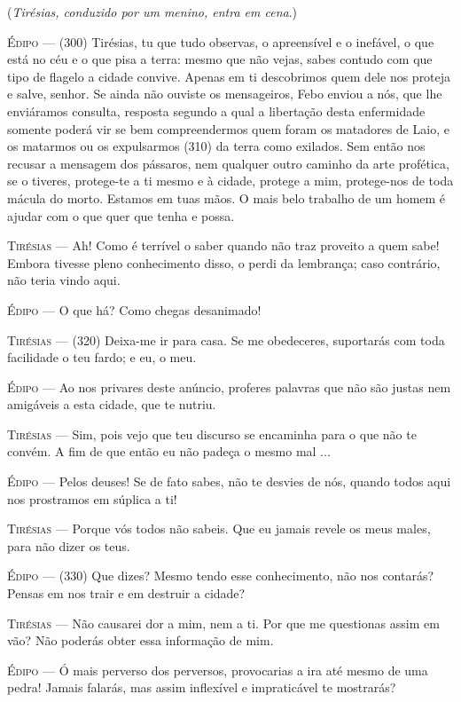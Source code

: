 (\emph{Tirésias, conduzido por um menino, entra em cena}.)

\textsc{Édipo} --- (300) Tirésias, tu que tudo observas, o apreensível e o inefável, o que
está no céu e o que pisa a terra: mesmo que não vejas, sabes contudo com
que tipo de flagelo a cidade convive. Apenas em ti descobrimos quem dele
nos proteja e salve, senhor. Se ainda não ouviste os mensageiros, Febo
enviou a nós, que lhe enviáramos consulta, resposta segundo a qual a
libertação desta enfermidade somente poderá vir se bem compreendermos
quem foram os matadores de Laio, e os matarmos ou os expulsarmos (310)
da terra como exilados. Sem então nos recusar a mensagem dos pássaros,
nem qualquer outro caminho da arte profética, se o tiveres, protege-te a
ti mesmo e à cidade, protege a mim, protege-nos de toda mácula do morto.
Estamos em tuas mãos. O mais belo trabalho de um homem é ajudar com o
que quer que tenha e possa.

\textsc{Tirésias} --- Ah! Como é terrível o saber quando não traz proveito a quem sabe! Embora
tivesse pleno conhecimento disso, o perdi da lembrança; caso contrário,
não teria vindo aqui.

\textsc{Édipo} --- O que há? Como chegas desanimado!

\textsc{Tirésias} --- (320) Deixa-me ir para casa. Se me obedeceres, suportarás com toda
facilidade o teu fardo; e eu, o meu.

\textsc{Édipo} --- Ao nos privares deste anúncio, proferes palavras que não são justas nem
amigáveis a esta cidade, que te nutriu.

\textsc{Tirésias} --- Sim, pois vejo que teu discurso se encaminha para o que não te convém. A
fim de que então eu não padeça o mesmo mal ...

\textsc{Édipo} --- Pelos deuses! Se de fato sabes, não te desvies de nós, quando todos aqui
nos prostramos em súplica a ti!

\textsc{Tirésias} --- Porque vós todos não sabeis. Que eu jamais revele os meus males, para
não dizer os teus.

\textsc{Édipo} --- (330) Que dizes? Mesmo tendo esse conhecimento, não nos contarás? Pensas
em nos trair e em destruir a cidade?

\textsc{Tirésias} --- Não causarei dor a mim, nem a ti. Por que me questionas assim em vão?
Não poderás obter essa informação de mim.

\textsc{Édipo} --- Ó mais perverso dos perversos, provocarias a ira até mesmo de uma pedra!
Jamais falarás, mas assim inflexível e impraticável te mostrarás?

